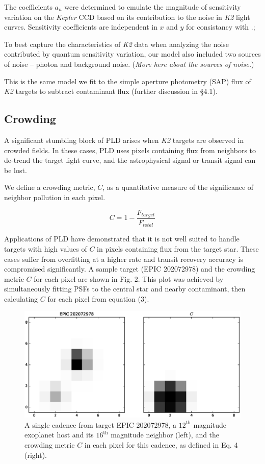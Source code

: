 \documentclass[12pt,preprint]{aastex}
\begin{document}
The coefficients $a_n$ were determined to emulate the magnitude of sensitivity variation on the \textit{Kepler} CCD based on its contribution to the noise in \textit{K2} light curves. Sensitivity coefficients are independent in $x$ and $y$ for consistancy with \cite{toyozumi_ashley_2005}.;

To best capture the characteristics of \textit{K2} data when analyzing the noise contributed by quantum sensitivity variation, our model also included two sources of noise -- photon and background noise. (\textit{More here about the sources of noise.})

This is the same model we fit to the simple aperture photometry (SAP) flux of \textit{K2} targets to subtract contaminant flux (further discussion in \S 4.1).

\subsection{Crowding}

A significant stumbling block of PLD arises when \textit{K2} targets are observed in crowded fields. In these cases, PLD uses pixels containing flux from neighbors to de-trend the target light curve, and the astrophysical signal or transit signal can be lost.

We define a crowding metric, $C$, as a quantitative measure of the significance of neighbor pollution in each pixel.

\[
\tag{4}
C = 1 - \frac{F_{target}}{F_{total}}
\]

Applications of PLD have demonstrated that it is not well suited to handle targets with high values of $C$ in pixels containing flux from the target star. These cases suffer from overfitting at a higher rate and transit recovery accuracy is compromised significantly. A sample target (EPIC 202072978) and the crowding metric $C$ for each pixel are shown in Fig. 2. This plot was achieved by simultaneously fitting PSFs to the central star and nearby contaminant, then calculating $C$ for each pixel from equation (3).

\begin{figure}[h]
	\centering
	\includegraphics[width=1.0\linewidth]{cr.eps}
	\caption{A single cadence from target EPIC 202072978, a $12^{\text{th}}$ magnitude exoplanet host and its $16^{\text{th}}$ magnitude neighbor (left), and the crowding metric $C$ in each pixel for this cadence, as defined in Eq. 4 (right).}
	\label{fig:crowding}
\end{figure}
\end{document}
